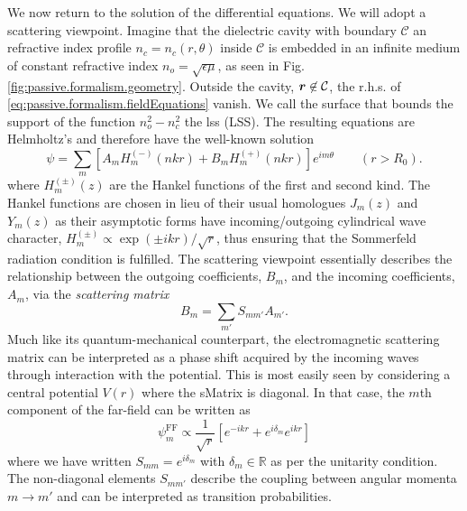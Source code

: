We now return to the solution of the differential equations. 
We will adopt a scattering viewpoint. 
Imagine that the dielectric cavity with boundary $\mathcal{C}$
an refractive index profile $n_c=n_c(r,\theta)$ inside $\mathcal{C}$ is embedded in an infinite
medium of constant refractive index  $n_o=\sqrt{\epsilon\mu}$, 
as seen in Fig. \ref{fig:passive.formalism.geometry}. 
Outside the cavity, $\boldsymbol{r}\not\in{\mathcal{C}}$, 
the r.h.s. of \eqref{eq:passive.formalism.fieldEquations} vanish. 
We call the surface that bounds the support of the function 
$n_o^2-n_c^2$ the \gls{lss} (LSS).
The resulting equations are Helmholtz's and therefore have the well-known solution
  \begin{equation}
    \label{eq:passive.formalism.hankelSolution}
    \psi = \sum_{m} \left[A_m H_m^{(-)}(nkr) + B_m H_m^{(+)}(nkr)\right]e^{im\theta} \qquad (r>R_0).
  \end{equation}
where $H_m^{(\pm)}(z)$ are the Hankel functions of the first
and second kind. The Hankel functions are chosen in lieu of their
usual homologues $J_m(z)$ and $Y_m(z)$ as their asymptotic forms 
have incoming/outgoing cylindrical wave character, 
$H_m^{(\pm)}\propto \exp(\pm ikr)/\sqrt{r}$, thus ensuring that
the Sommerfeld radiation condition is fulfilled. The scattering
viewpoint essentially describes the relationship between the 
outgoing coefficients, $B_m$, and the incoming coefficients, $A_m$,
via the \textit{scattering matrix}
  \begin{equation}
  	\label{eq:passive.formalism.defSmatrix}
    B_m = \sum_{m'}S_{mm'}A_{m'}. 
  \end{equation}
Much like its quantum-mechanical counterpart, the electromagnetic scattering
matrix can be interpreted as a phase shift acquired by the incoming
waves through interaction with the potential. This is most easily seen
by considering a central potential $V(r)$ where the \gls{sMatrix}
is diagonal. In that case, the $m$th component of the far-field can
be written as
  \begin{equation}
   \label{eq:passive.formalism.centralPotentialField}
   \psi_m^\text{FF} \propto \frac{1}{\sqrt{r}}\left[e^{-ikr}+e^{i\delta_m}e^{ikr}\right]
  \end{equation}
where we have written $S_{mm}=e^{i\delta_m}$ with $\delta_m\in\mathbb{R}$ 
as per the unitarity condition. The non-diagonal
elements $S_{mm'}$ describe the coupling between angular
momenta $m\rightarrow m'$ and can be interpreted as transition
probabilities.


